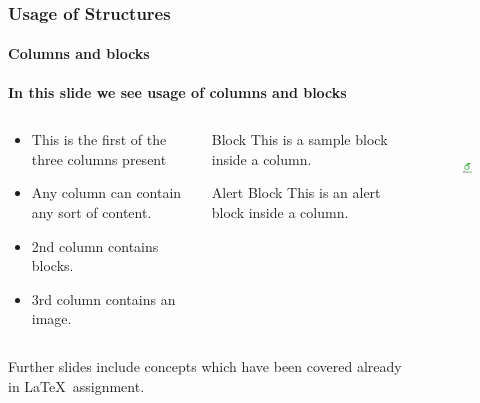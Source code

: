 \documentclass{beamer}
\begin{document}
\begin{frame}[t]
\label{imguse}
\frametitle{Usage of Structures}
\framesubtitle{Columns and blocks}
 \textbf{In this slide we see usage of columns and blocks}
 
 \begin{columns}
    \begin{column}{0.4\textwidth}
        \begin{itemize}
    \item  This is the first of the three columns present
    \item Any column can contain any sort of content.
    \item 2nd column contains blocks.
    \item 3rd column contains an image.

    \end{itemize}
    \end{column}
    \begin{column}{0.35\textwidth}
        \begin{block}{Block}
        This is a sample block inside a column.
        \end{block}
        \begin{alertblock}{Alert Block}
        This is an alert block inside a column.
        \end{alertblock}
    \end{column}
    \begin{column}{0.25\textwidth}
    \centering
    \begin{figure}
        \centering
        \includegraphics[height=2cm]{overleaf.png}
    \end{figure}
    \end{column}
\end{columns}
\vfill
{
Further slides include concepts which have been covered already \\ in \LaTeX\ assignment.}

\end{frame}
\end{document}
